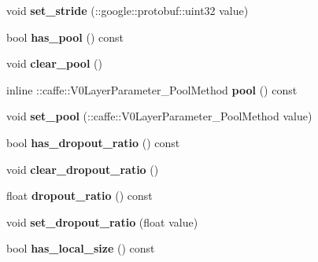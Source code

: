 \begin{DoxyCompactItemize}
void {\bfseries set\+\_\+stride} (\+::google\+::protobuf\+::uint32 value)
\item 
\mbox{\label{classcaffe_1_1_v0_layer_parameter_a7679ea5a346a9136bc68938d8657012c}} 
bool {\bfseries has\+\_\+pool} () const
\item 
\mbox{\label{classcaffe_1_1_v0_layer_parameter_a06dfc9c30abbd0a98e8de33a1b2881bc}} 
void {\bfseries clear\+\_\+pool} ()
\item 
\mbox{\label{classcaffe_1_1_v0_layer_parameter_ab09a59ed3a3d735d90fee132aa1c5928}} 
inline \+::caffe\+::\+V0\+Layer\+Parameter\+\_\+\+Pool\+Method {\bfseries pool} () const
\item 
\mbox{\label{classcaffe_1_1_v0_layer_parameter_a7551789b405feb2485d3be424701b7cf}} 
void {\bfseries set\+\_\+pool} (\+::caffe\+::\+V0\+Layer\+Parameter\+\_\+\+Pool\+Method value)
\item 
\mbox{\label{classcaffe_1_1_v0_layer_parameter_a72d1d7c9eae75df76f09eadcc27f1ab0}} 
bool {\bfseries has\+\_\+dropout\+\_\+ratio} () const
\item 
\mbox{\label{classcaffe_1_1_v0_layer_parameter_ab02d95ef6e6ccf7e79815d57f26dc5fd}} 
void {\bfseries clear\+\_\+dropout\+\_\+ratio} ()
\item 
\mbox{\label{classcaffe_1_1_v0_layer_parameter_a696a26410e90ca34c1d3f8ff29fe50cb}} 
float {\bfseries dropout\+\_\+ratio} () const
\item 
\mbox{\label{classcaffe_1_1_v0_layer_parameter_a30aafc5d931b49d751d07f242779bde9}} 
void {\bfseries set\+\_\+dropout\+\_\+ratio} (float value)
\item 
\mbox{\label{classcaffe_1_1_v0_layer_parameter_a83f0bfabbc5a6c3c9388e0298718ea79}} 
bool {\bfseries has\+\_\+local\+\_\+size} () const
\item 
\mbox{\label{classcaffe_1_1_v0_layer_parameter_ad35e52c58c2ec468246bfa20470ceb47}} 

\end{DoxyCompactItemize}
